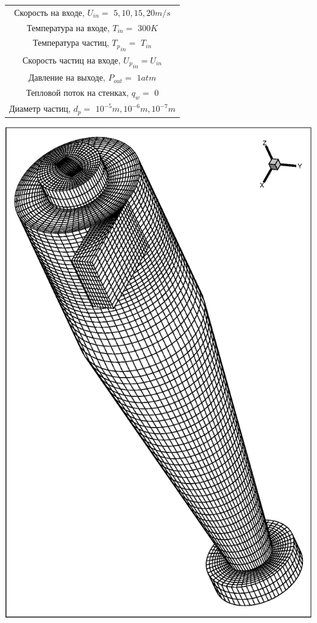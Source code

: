 \begin{minipage}{0.6\textwidth}
    \label{cycloneBC}
	\begin{tabular}{c}
		\hline
		\label{geometrytable}
		Скорость на входе, $U_{in}=$  $5, 10, 15, 20 m/s$ \\
		Температура на входе, $T_{in}=$  $300 K$ \\
		Температура частиц, ${T_p}_{in}=$  $T_{in}$ \\
		Скорость частиц на входе, ${U_p}_{in} = U_{in}$ \\
		Давление на выходе, $P_{out}=$  $1atm$ \\
		Тепловой поток на стенках, $q_w=$  $0$ \\
		Диаметр частиц, $d_p=$ $10^{-5}m, 10^{-6}m, 10^{-7}	m$\\
	\end{tabular}
\end{minipage}
\hspace{2em}
\begin{minipage}{0.35\textwidth}
    \includegraphics[scale=0.45]{meshCyclone}
	\label{fig:cycloneMesh}
\end{minipage}
\vspace{1em}  

